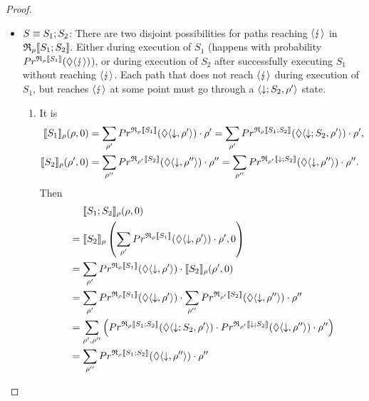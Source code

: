 \documentclass[a4paper,UKenglish,cleveref, autoref, thm-restate]{lipics-v2021}
\begin{document}
\begin{proof}
\begin{enumerate}
\begin{itemize}
        \item $S \equiv S_1;S_2$: There are two disjoint possibilities for paths reaching $\langle \lightning \rangle$ in $\mathfrak{R}_{\rho}\llbracket S_1;S_2 \rrbracket$. Either during execution of $S_1$ (happens with probability $Pr^{\mathfrak{R}_{\rho}\llbracket S_1 \rrbracket}(\lozenge \langle \lightning \rangle)$), or during execution of $S_2$ after successfully executing $S_1$ without reaching $\langle \lightning \rangle$. Each path that does not reach $\langle \lightning \rangle$ during execution of $S_1$, but reaches $\langle \lightning \rangle$ at some point must go through a $\langle \downarrow;S_2 , \rho' \rangle$ state.
        \begin{enumerate}
            \item It is \begin{align*}
            \llbracket S_1 \rrbracket_{\rho}(\rho,0) &= \sum_{\rho'} Pr^{\mathfrak{R}_{\rho}\llbracket S_1 \rrbracket}(\lozenge \langle \downarrow , \rho' \rangle) \cdot \rho' = \sum_{\rho'} Pr^{\mathfrak{R}_{\rho}\llbracket S_1;S_2 \rrbracket}(\lozenge \langle \downarrow;S_2 , \rho' \rangle) \cdot \rho',\\
            \llbracket S_2 \rrbracket_{\rho}(\rho',0) &= \sum_{\rho''} Pr^{\mathfrak{R}_{\rho'}\llbracket S_2 \rrbracket}(\lozenge \langle \downarrow , \rho'' \rangle) \cdot \rho'' = \sum_{\rho''} Pr^{\mathfrak{R}_{\rho'}\llbracket \downarrow; S_2 \rrbracket}(\lozenge \langle \downarrow , \rho'' \rangle) \cdot \rho'' .
        \end{align*} Then
        \begin{align*}
            &\phantom{=.}\llbracket S_1;S_2 \rrbracket_{\rho}(\rho,0)\\
            &=  \llbracket S_2 \rrbracket_{\rho}\left(\sum_{\rho'} Pr^{\mathfrak{R}_{\rho}\llbracket S_1 \rrbracket}(\lozenge \langle \downarrow , \rho' \rangle) \cdot \rho' , 0\right) \\
            &= \sum_{\rho'} Pr^{\mathfrak{R}_{\rho}\llbracket S_1 \rrbracket}(\lozenge \langle \downarrow , \rho' \rangle) \cdot \llbracket S_2 \rrbracket_{\rho}(\rho',0) \\
            &= \sum_{\rho'} Pr^{\mathfrak{R}_{\rho}\llbracket S_1 \rrbracket}(\lozenge \langle \downarrow , \rho' \rangle) \cdot \sum_{\rho''} Pr^{\mathfrak{R}_{\rho'}\llbracket S_2 \rrbracket}(\lozenge \langle \downarrow , \rho'' \rangle) \cdot \rho''\\
            &= \sum_{\rho',\rho''} \left(Pr^{\mathfrak{R}_{\rho}\llbracket S_1;S_2 \rrbracket}(\lozenge \langle \downarrow;S_2 , \rho' \rangle) \cdot Pr^{\mathfrak{R}_{\rho'}\llbracket \downarrow; S_2 \rrbracket}(\lozenge \langle \downarrow , \rho'' \rangle) \cdot \rho''\right)\\
            &= \sum_{\rho''} Pr^{\mathfrak{R}_{\rho}\llbracket S_1;S_2 \rrbracket}(\lozenge \langle \downarrow , \rho'' \rangle) \cdot \rho''
        \end{align*}

\end{enumerate}
\end{itemize}
\end{enumerate}
\end{proof}
\end{document}
